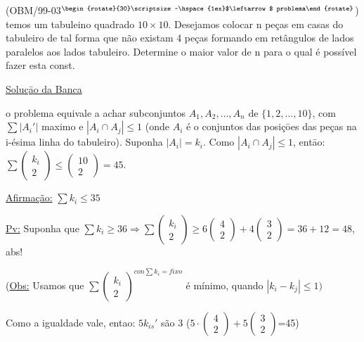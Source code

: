 \documentclass[a4paper,12pt]{article}
\renewcommand{\leq}{\ensuremath{\leqslant}}
\renewcommand{\geq}{\ensuremath{\geqslant}}
\theoremstyle{plain} %
\theoremstyle{definition} %
\theoremstyle{remark} %
\newcommand{\rotsupup}[1]{\begin{rotate}{30}\scriptsize ~#1\end{rotate}} %
\begin{document}
	
	
	(OBM/99-03$^{\rotsupup{\hspace{1ex}$\leftarrow$ problema}}$) temos um tabuleino quadrado $10\times 10$. Desejamos colocar n pe\c{c}as em casas do tabuleiro de tal forma que n\~ao existam 4 pe\c{c}as formando em ret\^angulos de lados paralelos aos lados tabuleiro. Determine o maior valor de n para o qual \'e poss\'ivel fazer esta const.
	
	\begin{framed}
		\underline{Solu\c{c}\=ao da Banca}
		
		o problema equivale a achar subconjuntos $A_1, A_2, \dotso, A_n$ de $\{1,2,\dotso,10\}$, com $\sum |A_i'|$ maximo e $|A_i\cap A_j|\leq 1$ (onde $A_i$ \'e o conjuntos das posi\c{c}\=oes das pe\c{c}as na i-\'esima linha do tabuleiro). Suponha $|A_i|=k_i$. Como $|A_i\cap A_j|\leq 1$, ent\=ao: $\sum \left(\begin{smallmatrix}
			k_i\\
			2
		\end{smallmatrix}\right)\leq \left(\begin{smallmatrix}
			10\\
			2
		\end{smallmatrix}\right)=45$.
		
		\underline{Afirma\c{c}\~ao:} $\sum k_i\leq 35$
		
		\underline{Pv:} Suponha que $\sum k_i\geq 36 \Rightarrow \sum \left(\begin{smallmatrix}
			k_i\\
			2
		\end{smallmatrix}\right)\geq 6\left(\begin{smallmatrix}
			4\\
			2
		\end{smallmatrix}\right)+4\left(\begin{smallmatrix}
			3\\
			2
		\end{smallmatrix}\right)=36+12=48$, abs! \tiny\textblock 
		
		\normalsize
		
		
		
		(\underline{Obs:} Usamos que $\sum \left(\begin{smallmatrix}
			k_i\\
			2
		\end{smallmatrix}\right)^{con \sum k_i=fixo}$ \'e m\'inimo, quando $|k_i-k_j|\leq 1)$
		
		Como a igualdade vale, ent\-ao: $5k_{is}'$ s\~ao 3 ($5\cdot \left(\begin{smallmatrix}
			4\\
			2
		\end{smallmatrix}\right)+5\left(\begin{smallmatrix}
			3\\
			2
		\end{smallmatrix}\right)$=45)
		

\end{framed}
\end{document}
